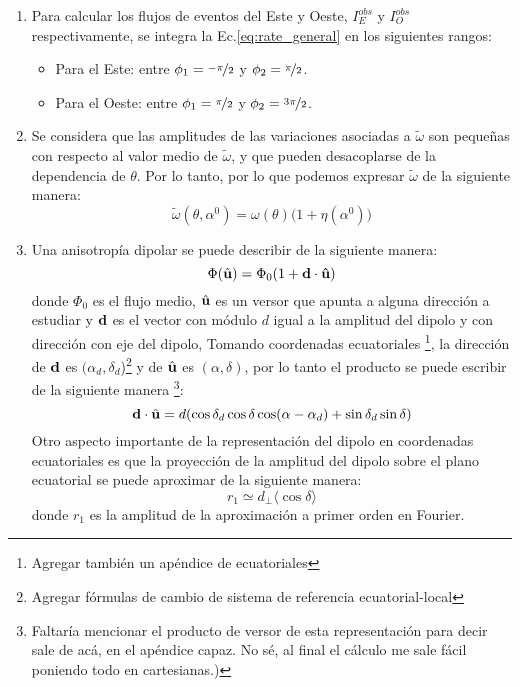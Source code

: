 \begin{enumerate}
    \item Para calcular los flujos de eventos del Este y Oeste, $I^{obs}_E$ y $I_O^{obs}$ respectivamente, se integra la Ec.\ref{eq:rate_general} en los siguientes  rangos:
    \begin{itemize}
        \item Para el Este: entre $\phi_1=\nicefrac{-\pi}{2}$ y $\phi_2=\nicefrac{\pi}{2}$.
        \item Para el Oeste: entre $\phi_1=\nicefrac{\pi}{2}$ y $\phi_2=\nicefrac{3\pi}{2}$.
    \end{itemize}

    \item Se considera que las amplitudes de las variaciones asociadas a $\tilde{\omega}$ son pequeñas con respecto al valor medio de $\tilde{\omega}$, y que pueden  desacoplarse de la dependencia de $\theta$. Por lo tanto, por lo que podemos expresar $\tilde{\omega}$ de la siguiente manera:
    \begin{equation}
        \tilde{\omega}(\theta, \alpha^0) = \omega(\theta)\big(1 + \eta(\alpha^0) \big)
        \label{eq:omega_expandido}
    \end{equation}

    \item Una anisotropía dipolar se puede describir de la siguiente manera:
    \begin{equation}
        \Phi(\hat{\bf{u}}) = \Phi_0(1+\bf{d}\cdot\hat{\bf{u}})
        \label{eq:dipolo_general}
    \end{equation}
    \noindent donde $\Phi_0$ es el flujo medio, $\hat{\bf{u}}$ es un versor que apunta a alguna dirección a estudiar y $\bf{d}$ es el vector con módulo $d$ igual a la amplitud del dipolo y  con dirección  con eje del dipolo, Tomando coordenadas ecuatoriales \footnote{Agregar también un apéndice de ecuatoriales}, la dirección de $\bf{d}$ es $(\alpha_d, \delta_d$)\footnote{Agregar fórmulas de cambio de sistema de referencia ecuatorial-local} y  de $\hat{\bf{u}}$ es $(\alpha, \delta)$, por lo tanto  el producto se puede escribir de la siguiente manera \footnote{Faltaría mencionar el producto de versor de esta representación para decir sale de acá, en el apéndice capaz. No sé, al final el cálculo me  sale fácil poniendo  todo en cartesianas.)}:
    \begin{equation*}
        \textbf{d}\cdot\hat{\bf{u}}= d (\cos\delta_d \cos\delta \cos(\alpha - \alpha_d) + \sin\delta_d  \sin\delta)
        \label{eq:product_ud}
    \end{equation*}
    Otro aspecto importante de la representación del dipolo en coordenadas ecuatoriales es que la proyección de la amplitud del dipolo sobre el plano ecuatorial se puede aproximar de la siguiente manera:
    \begin{equation}
        r_1 \simeq d_\perp \langle \cos\delta \rangle
        \label{eq:fourier_perp}
    \end{equation}
    donde $r_1$ es la amplitud de la aproximación a primer orden en Fourier.


\end{enumerate}
